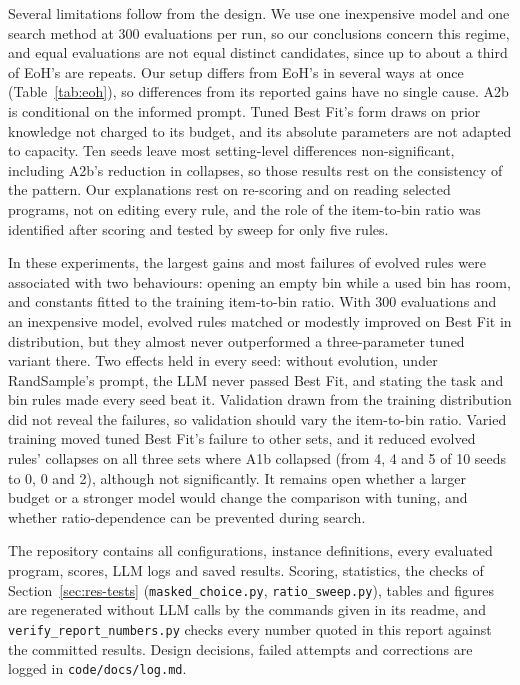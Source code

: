 \documentclass[10pt,twocolumn]{article}
\makeatletter
\renewcommand\section{\@startsection{section}{1}{\z@}{2.6ex \@plus .6ex \@minus .2ex}{1.4ex \@plus .2ex}{\normalfont\Large\bfseries}}
\renewcommand\paragraph{\@startsection{paragraph}{4}{\z@}{1.4ex \@plus .4ex \@minus .2ex}{-1em}{\normalfont\normalsize\bfseries}}
\makeatother
\begin{document}
Several limitations follow from the design. We use one inexpensive model and one search method at 300 evaluations per run, so our conclusions concern this regime, and equal evaluations are not equal distinct candidates, since up to about a third of EoH's are repeats. Our setup differs from EoH's in several ways at once (Table~\ref{tab:eoh}), so differences from its reported gains have no single cause. A2b is conditional on the informed prompt. Tuned Best Fit's form draws on prior knowledge not charged to its budget, and its absolute parameters are not adapted to capacity. Ten seeds leave most setting-level differences non-significant, including A2b's reduction in collapses, so those results rest on the consistency of the pattern. Our explanations rest on re-scoring and on reading selected programs, not on editing every rule, and the role of the item-to-bin ratio was identified after scoring and tested by sweep for only five rules.

\section{Conclusion}
In these experiments, the largest gains and most failures of evolved rules were associated with two behaviours: opening an empty bin while a used bin has room, and constants fitted to the training item-to-bin ratio. With 300 evaluations and an inexpensive model, evolved rules matched or modestly improved on Best Fit in distribution, but they almost never outperformed a three-parameter tuned variant there. Two effects held in every seed: without evolution, under RandSample's prompt, the LLM never passed Best Fit, and stating the task and bin rules made every seed beat it. Validation drawn from the training distribution did not reveal the failures, so validation should vary the item-to-bin ratio. Varied training moved tuned Best Fit's failure to other sets, and it reduced evolved rules' collapses on all three sets where A1b collapsed (from 4, 4 and 5 of 10 seeds to 0, 0 and 2), although not significantly. It remains open whether a larger budget or a stronger model would change the comparison with tuning, and whether ratio-dependence can be prevented during search.

\paragraph{Reproducibility.} The repository contains all configurations, instance definitions, every evaluated program, scores, LLM logs and saved results. Scoring, statistics, the checks of Section~\ref{sec:res-tests} (\texttt{masked\_choice.py}, \texttt{ratio\_sweep.py}), tables and figures are regenerated without LLM calls by the commands given in its readme, and \texttt{verify\_report\_numbers.py} checks every number quoted in this report against the committed results. Design decisions, failed attempts and corrections are logged in \texttt{code/docs/log.md}.

{\footnotesize


}
\end{document}
